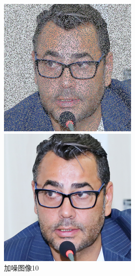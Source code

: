 \begin{figure}[H]
  \centering
  \begin{minipage}[b]{0.3\linewidth}
\includegraphics[width=\linewidth]{Picture/input/00005.png}
    \caption{加噪图像10}
    \label{noised image }
  \end{minipage}
  \hspace{0.1cm} %
   \begin{minipage}[b]{0.3\linewidth}
    \includegraphics[width=\linewidth]{Picture/label/00005.png}

\end{minipage}
\end{figure}
